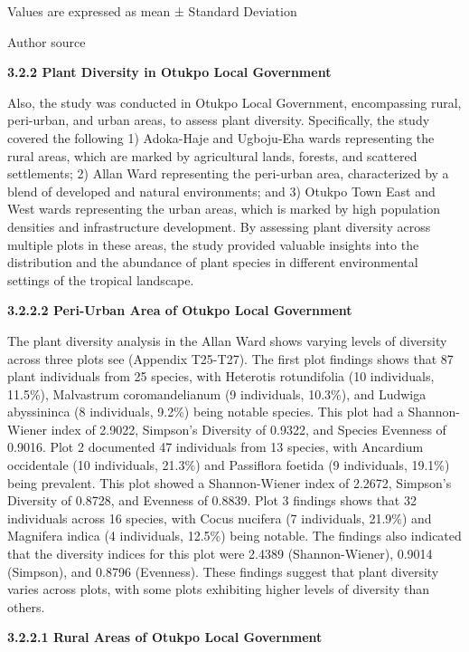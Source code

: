 Values are expressed as mean ± Standard Deviation

Author source

{}\textbf{3.2.2 Plant Diversity in Otukpo Local Government}

Also, the study was conducted in Otukpo Local Government, encompassing rural, peri-urban, and urban areas, to assess plant diversity. Specifically, the study covered the following 1) Adoka-Haje and Ugboju-Eha wards representing the rural areas, which are marked by agricultural lands, forests, and scattered settlements; 2) Allan Ward representing the peri-urban area, characterized by a blend of developed and natural environments; and 3) Otukpo Town East and West wards representing the urban areas, which is marked by high population densities and infrastructure development. By assessing plant diversity across multiple plots in these areas, the study provided valuable insights into the distribution and the abundance of plant species in different environmental settings of the tropical landscape.

{}\textbf{3.2.2.2 Peri-Urban Area of Otukpo Local Government}

The plant diversity analysis in the Allan Ward shows varying levels of diversity across three plots see (Appendix T25-T27). The first plot findings shows that 87 plant individuals from 25 species, with Heterotis rotundifolia (10 individuals, 11.5\%), Malvastrum coromandelianum (9 individuals, 10.3\%), and Ludwiga abyssininca (8 individuals, 9.2\%) being notable species. This plot had a Shannon-Wiener index of 2.9022, Simpson's Diversity of 0.9322, and Species Evenness of 0.9016. Plot 2 documented 47 individuals from 13 species, with Ancardium occidentale (10 individuals, 21.3\%) and Passiflora foetida (9 individuals, 19.1\%) being prevalent. This plot showed a Shannon-Wiener index of 2.2672, Simpson's Diversity of 0.8728, and Evenness of 0.8839. Plot 3 findings shows that 32 individuals across 16 species, with Cocus nucifera (7 individuals, 21.9\%) and Magnifera indica (4 individuals, 12.5\%) being notable. The findings also indicated that the diversity indices for this plot were 2.4389 (Shannon-Wiener), 0.9014 (Simpson), and 0.8796 (Evenness). These findings suggest that plant diversity varies across plots, with some plots exhibiting higher levels of diversity than others.

{}\textbf{3.2.2.1 Rural Areas of Otukpo Local Government}

